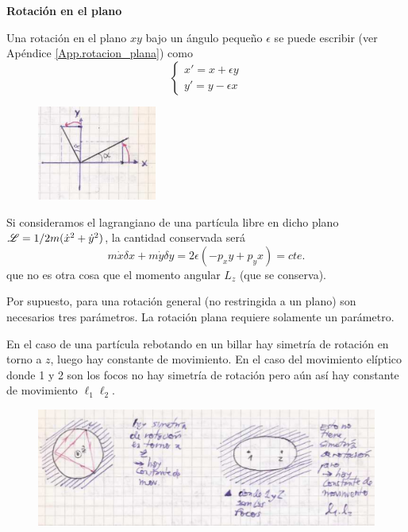 \documentclass[10pt,oneside]{CBFT_book}
\begin{document}
\begin{ejemplo}{\bfseries Rotación en el plano }

Una rotación en el plano $xy$ bajo un ángulo pequeño $\epsilon$ se puede escribir (ver Apéndice 
\ref{App.rotacion_plana}) como 
\[
 \begin{cases}
  x' = x + \epsilon y \\
  y' = y - \epsilon x
 \end{cases}
\]
\begin{figure}[!htb]
	\begin{center}
	\includegraphics[width=0.35\textwidth]{images/fig_mc_noether1.pdf}	 
	\end{center}
	\caption{}
	\label{fig_mc_noether1}
\end{figure} 

Si consideramos el lagrangiano de una partícula libre en dicho plano $ \mathscr{L} = 1/2 m (\dot{x}^2 + \dot{y}^2)$, la 
cantidad conservada será 
\[
	m \dot{x} \delta x + m \dot{y} \delta y = 2\epsilon ( -p_x y + p_y x ) = cte.
\]
que no es otra cosa que el momento angular $L_z$ (que se conserva).

Por supuesto, para una rotación general (no restringida a un plano) son necesarios tres parámetros.
La rotación plana requiere solamente un parámetro.
\end{ejemplo}


En el caso de una partícula rebotando en un billar hay simetría de rotación en torno a $z$, luego hay
constante de movimiento. En el caso del movimiento elíptico donde 1 y 2 son los focos no hay simetría
de rotación pero aún así hay constante de movimiento $ \ell_1 \ell_2 $.

\begin{figure}[!htb]
	\begin{center}
	\includegraphics[width=1.0\textwidth]{images/fig_mc_noether2.pdf}	 
	\end{center}
	\caption{}
	\label{fig_mc_noether2}
\end{figure} 
\end{document}

